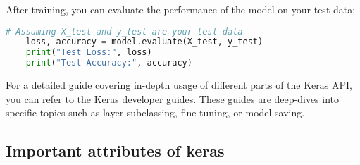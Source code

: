 	After training, you can evaluate the performance of the model on your test data:
	
\begin{lstlisting}[language=Python, caption={Evaluating the Keras model}, label={code:keras-model-evaluation}, style=pythonstyle]
	# Assuming X_test and y_test are your test data
	loss, accuracy = model.evaluate(X_test, y_test)
	print("Test Loss:", loss)
	print("Test Accuracy:", accuracy)
\end{lstlisting}
	
	
	For a detailed guide covering in-depth usage of different parts of the Keras API, you can refer to the Keras developer guides. These guides are deep-dives into specific topics such as layer subclassing, fine-tuning, or model saving.
	
	\subsection{Important attributes of keras}
	
	
	
